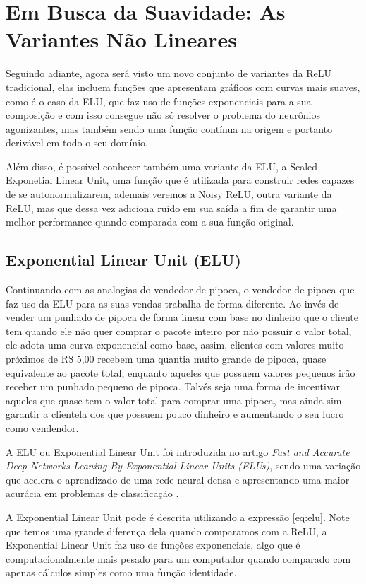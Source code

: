 \section{Em Busca da Suavidade: As Variantes Não Lineares}

Seguindo adiante, agora será visto um novo conjunto de variantes da ReLU tradicional, elas incluem funções que apresentam gráficos com curvas mais suaves, como é o caso da ELU, que faz uso de funções exponenciais para a sua composição e com isso consegue não só resolver o problema do neurônios agonizantes, mas também sendo uma função contínua na origem e portanto derivável em todo o seu domínio.

Além disso, é possível conhecer também uma variante da ELU, a Scaled Exponetial Linear Unit, uma função que é utilizada para construir redes capazes de se autonormalizarem, ademais veremos a Noisy ReLU, outra variante da ReLU, mas que dessa vez adiciona ruído em sua saída a fim de garantir uma melhor performance quando comparada com a sua função original.

\subsection{Exponential Linear Unit (ELU)}

Continuando com as analogias do vendedor de pipoca, o vendedor de pipoca que faz uso da ELU para as suas vendas trabalha de forma diferente. Ao invés de vender um punhado de pipoca de forma linear com base no dinheiro que o cliente tem quando ele não quer comprar o pacote inteiro por não possuir o valor total, ele adota uma curva exponencial como base, assim, clientes com valores muito próximos de R\$ 5,00 recebem uma quantia muito grande de pipoca, quase equivalente ao pacote total, enquanto aqueles que possuem valores pequenos irão receber um punhado pequeno de pipoca. Talvés seja uma forma de incentivar aqueles que quase tem o valor total para comprar uma pipoca, mas ainda sim garantir a clientela dos que possuem pouco dinheiro e aumentando o seu lucro como vendendor.

A ELU ou Exponential Linear Unit foi introduzida no artigo \textit{Fast and Accurate Deep Networks Leaning By Exponential Linear Units (ELUs)}, sendo uma variação que acelera o aprendizado de uma rede neural densa e apresentando uma maior acurácia em problemas de classificação \parencite{ELUArticle}.

A Exponential Linear Unit pode é descrita utilizando a expressão \ref{eq:elu}. Note que temos uma grande diferença dela quando comparamos com a ReLU, a Exponential Linear Unit faz uso de funções exponenciais, algo que é computacionalmente mais pesado para um computador quando comparado com apenas cálculos simples como uma função identidade.

